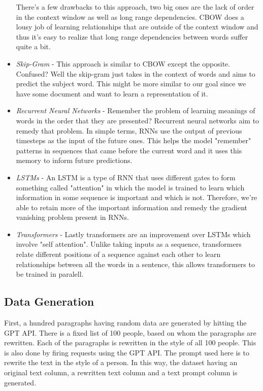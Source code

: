 \documentclass{article}
\begin{document}
\begin{itemize}
    There's a few drawbacks to this approach, two big ones are the lack of order in the context window as well as long range dependencies. CBOW does a lousy job of learning relationships that are outside of the context window and thus it's easy to realize that long range dependencies between words suffer quite a bit.
    \item \textit{Skip-Gram} - This approach is similar to CBOW except the opposite. Confused? Well the skip-gram just takes in the context of words and aims to predict the subject word. This might be more similar to our goal since we have some document and want to learn a representation of it. \cite{mikolov2013distributed}
    \item \textit{Recurrent Neural Networks} - Remember the problem of learning meanings of words in the order that they are presented? Recurrent neural networks aim to remedy that problem. In simple terms, RNNs use the output of previous timesteps as the input of the future ones. This helps the model "remember" patterns in sequences that came before the current word and it uses this memory to inform future predictions. \cite{schmidt2019recurrent}
    \item \textit{LSTMs} - An LSTM is a type of RNN that uses different gates to form something called "attention" in which the model is trained to learn which information in some sequence is important and which is not. Therefore, we're able to retain more of the important information and remedy the gradient vanishing problem present in RNNs. \cite{818041}
    \item \textit{Transformers} - Lastly transformers are an improvement over LSTMs which involve "self attention". Unlike taking inputs as a sequence, transformers relate different positions of a sequence against each other to learn relationships between all the words in a sentence, this allows transformers to be trained in paralell. \cite{vaswani2023attention}
    
\end{itemize}


\subsection{Data Generation} 

First, a hundred paragraphs having random data are generated by hitting the GPT API. There is a fixed list of 100 people, based on whom the paragraphs are rewritten. Each of the paragraphs is rewritten in the style of all 100 people. This is also done by firing requests using the GPT API. The prompt used here is to rewrite the text in the style of a person. In this way, the dataset having an original text column, a rewritten text column and a text prompt column is generated.
 
\end{document}
